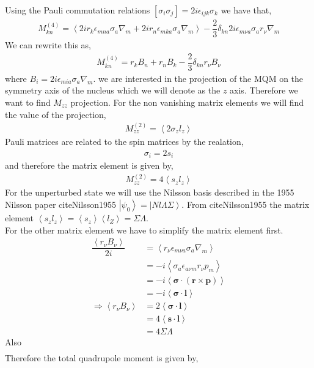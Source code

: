 \documentclass[10pt,a4paper, twoside]{report}
\begin{document}
Using the Pauli commutation relations $\left[\sigma_i\sigma_j\right] = 2i\epsilon_{ijk}\sigma_k$ we have that,
\begin{align*}
M^{(4)}_{kn} = \left<2ir_k\epsilon_{mna}\sigma_a\nabla_m + 2ir_n\epsilon_{mka}\sigma_a\nabla_m\right> - \dfrac{2}{3}\delta_{kn}2i\epsilon_{m\nu a}\sigma_{a}r_{\nu}\nabla_{m}
\end{align*}
We can rewrite this as,
\begin{align*}
M^{(4)}_{kn} = r_kB_n + r_nB_k - \dfrac{2}{3}\delta_{kn}r_{\nu}B_{\nu}
\end{align*}
where $B_{i} = 2i\epsilon_{mia}\sigma_a\nabla_m$. we are interested in the projection of the MQM on the symmetry axis of the nucleus which we will denote as the $z$ axis. Therefore we want to find $M_{zz}$ projection. For the non vanishing matrix elements we will find the value of the projection,
\begin{align*}
M_{zz}^{(2)} = \left<2\sigma_zl_z\right>
\end{align*}
Pauli matrices are related to the spin matrices by the realation,
\begin{align*}
\sigma_i = 2s_i
\end{align*}
and therefore the matrix element is given by,
\begin{align*}
M_{zz}^{(2)} = 4\left<s_zl_z\right>
\end{align*}
For the unperturbed state we will use the Nilsson basis described in the 1955 Nilsson paper citeNilsson1955 $\left|\psi_0\right> = \left|Nl\Lambda\Sigma\right>$. From citeNilsson1955 the matrix element $\left<s_zl_z\right> = \left<s_z\right>\left<l_Z\right> = \Sigma\Lambda$. \\
For the other matrix element we have to simplify the matrix element first. \\

\begin{align*}
\dfrac{\left<r_{\nu}B_{\nu}\right>}{2i} &= \left<r_{\nu}\epsilon_{m\nu a}\sigma_a \nabla_m\right> \\
&= -i\left<\sigma_a\epsilon_{a\nu m}r_{\nu} p_{m} \right> \\
&= -i\left<\boldsymbol{\sigma}\cdot\left(\textbf{r} \times \textbf{p}\right)\right> \\
&= -i\left<\boldsymbol{\sigma}\cdot\textbf{l}\right> \\ 
\Rightarrow \left<r_{\nu}B_{\nu}\right> &= 2\left<\boldsymbol{\sigma}\cdot\textbf{l}\right> \\
&= 4\left<\textbf{s}\cdot\textbf{l}\right> \\
&= 4\Sigma\Lambda
\end{align*}
Also
\begin{align*}
\end{align*}
Therefore the total quadrupole moment is given by,
\end{document}
